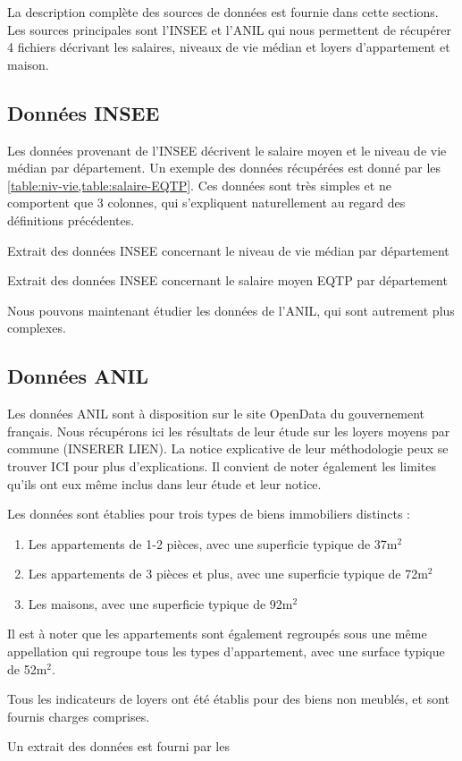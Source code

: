 La description complète des sources de données est fournie dans cette sections. Les sources principales sont l'INSEE et l'ANIL qui nous permettent de récupérer 4 fichiers décrivant les salaires, niveaux de vie médian et loyers d'appartement et maison. 

\subsection{Données INSEE}

Les données provenant de l'INSEE décrivent le salaire moyen et le niveau de vie médian par département. Un exemple des données récupérées est donné par les \cref{table:niv-vie,table:salaire-EQTP}. Ces données sont très simples et ne comportent que 3 colonnes, qui s'expliquent naturellement au regard des définitions précédentes.

\begin{table}[h]
    \centering
    
    \caption{Extrait des données INSEE concernant le niveau de vie médian par département\label{table:niv-vie}}
\end{table}


\begin{table}[h]
    \centering
    
    \caption{Extrait des données INSEE concernant le salaire moyen EQTP par département\label{table:salaire-EQTP}}
\end{table}

Nous pouvons maintenant étudier les données de l'ANIL, qui sont autrement plus complexes.

\subsection{Données ANIL}

Les données ANIL sont à disposition sur le site OpenData du gouvernement français. Nous récupérons ici les résultats de leur étude sur les loyers moyens par commune (INSERER LIEN). La notice explicative de leur méthodologie peux se trouver ICI pour plus d'explications. Il convient de noter également les limites qu'ils ont eux même inclus dans leur étude et leur notice. 

Les données sont établies pour trois types de biens immobiliers distincts :
\begin{enumerate}
    \item Les appartements de 1-2 pièces, avec une superficie typique de 37m$^2$
    \item Les appartements de 3 pièces et plus, avec une superficie typique de 72m$^2$
    \item Les maisons, avec une superficie typique de 92m$^2$
\end{enumerate}

Il est à noter que les appartements sont également regroupés sous une même appellation qui regroupe tous les types d'appartement, avec une surface typique de 52m$^2$.

Tous les indicateurs de loyers ont été établis pour des biens non meublés, et sont fournis charges comprises.

Un extrait des données est fourni par les 